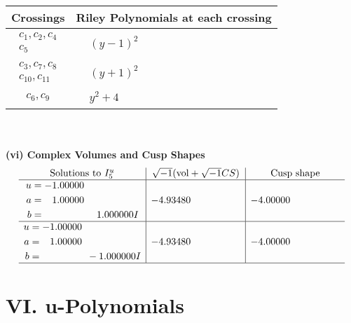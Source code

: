 \documentclass[1p]{elsarticle_modified}
\theoremstyle{definition}
\newcommand{\I}{\sqrt{-1}}
\begin{document}
\begin{tabular}{m{50pt}|m{274pt}}
Crossings & \hspace{64pt}Riley Polynomials at each crossing \\
\hline $$\begin{aligned}c_{1},c_{2},c_{4}\\c_{5}\end{aligned}$$&$\begin{aligned}
&(y-1)^2
\end{aligned}$\\
\hline $$\begin{aligned}c_{3},c_{7},c_{8}\\c_{10},c_{11}\end{aligned}$$&$\begin{aligned}
&(y+1)^2
\end{aligned}$\\
\hline $$\begin{aligned}c_{6},c_{9}\end{aligned}$$&$\begin{aligned}
&y^2+4
\end{aligned}$\\
\hline
\end{tabular}\\~\\
\newpage\flushleft \textbf{(vi) Complex Volumes and Cusp Shapes}
$$\begin{array}{c|c|c}  
\text{Solutions to }I^u_{5}& \I (\text{vol} + \sqrt{-1}CS) & \text{Cusp shape}\\
 \hline 
\begin{aligned}
u &= -1.00000\phantom{ +0.000000I} \\
a &= \phantom{-}1.00000\phantom{ +0.000000I} \\
b &= \phantom{-0.000000 -}1.000000 I\end{aligned}
 & -4.93480\phantom{ +0.000000I} & -4.00000\phantom{ +0.000000I} \\ \hline\begin{aligned}
u &= -1.00000\phantom{ +0.000000I} \\
a &= \phantom{-}1.00000\phantom{ +0.000000I} \\
b &= \phantom{-0.000000 } -1.000000 I\end{aligned}
 & -4.93480\phantom{ +0.000000I} & -4.00000\phantom{ +0.000000I}\\
 \hline 
 \end{array}$$\newpage
\newpage\renewcommand{\arraystretch}{1}
\centering \section*{ VI. u-Polynomials}
\end{document}
